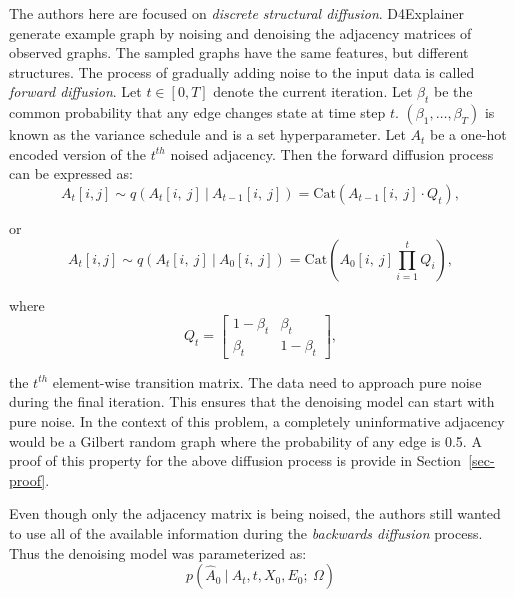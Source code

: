 \documentclass[
  11pt,
  letterpaper,
]{article}
\begin{document}
\quad The authors here are focused on \emph{discrete structural
diffusion}. D4Explainer generate example graph by noising and denoising
the adjacency matrices of observed graphs. The sampled graphs have the
same features, but different structures. The process of gradually adding
noise to the input data is called \emph{forward diffusion}. Let
\(t \in [0, T]\) denote the current iteration. Let \(\beta_t\) be the
common probability that any edge changes state at time step \(t\).
\((\beta_1, \dots, \beta_T)\) is known as the variance schedule and is a
set hyperparameter. Let \(A_t\) be a one-hot encoded version of the
\(t^{th}\) noised adjacency. Then the forward diffusion process can be
expressed as:\\
\begin{equation}
        A_t[i, j] \sim q(A_t[i, \ j] \ | \ A_{t-1}[i, \ j]) 
        = \text{Cat}(A_{t-1}[i, \ j] \cdot Q_t), 
\end{equation}

or \begin{equation} \label{eq-forward-diff}
        A_t[i, j] \sim q(A_t[i, \ j] \ | \ A_{0}[i, \ j]) 
        = \text{Cat}\left(A_0[i, \ j] \prod_{i=1}^t  Q_i \right), 
\end{equation}

where \[
Q_t = 
\left[
\begin{matrix}
    1-\beta_t & \beta_t \\ 
    \beta_t & 1 - \beta_t
\end{matrix}
\right], 
\]

the \(t^{th}\) element-wise transition matrix. The data need to approach
pure noise during the final iteration. This ensures that the denoising
model can start with pure noise. In the context of this problem, a
completely uninformative adjacency would be a Gilbert random graph where
the probability of any edge is 0.5. A proof of this property for the
above diffusion process is provide in Section~\ref{sec-proof}.

\quad Even though only the adjacency matrix is being noised, the authors
still wanted to use all of the available information during the
\emph{backwards diffusion} process. Thus the denoising model was
parameterized as: \begin{equation}
        p(\hat A_0 \ | \ A_t, t, X_0, E_0; \ \Omega)  
\end{equation}
\end{document}
